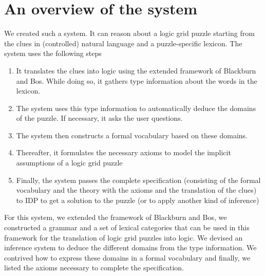 \section{An overview of the system}
We created such a system. It can reason about a logic grid puzzle starting from the clues in (controlled) natural language and a puzzle-specific lexicon. The system uses the following steps
\begin{enumerate}
  \item It translates the clues into logic using the extended framework of Blackburn and Bos. While doing so, it gathers type information about the words in the lexicon.
  \item The system uses this type information to automatically deduce the domains of the puzzle. If necessary, it asks the user questions.
  \item The system then constructs a formal vocabulary based on these domains.
  \item Thereafter, it formulates the necessary axioms to model the implicit assumptions of a logic grid puzzle
  \item Finally, the system passes the complete specification (consisting of the formal vocabulary and the theory with the axioms and the translation of the clues) to IDP \cite{IDP} to get a solution to the puzzle (or to apply another kind of inference)
\end{enumerate}

For this system, we extended the framework of Blackburn and Bos, we constructed a grammar and a set of lexical categories that can be used in this framework for the translation of logic grid puzzles into logic. We devised an inference system to deduce the different domains from the type information. We contrived how to express these domains in a formal vocabulary and finally, we listed the axioms necessary to complete the specification.



